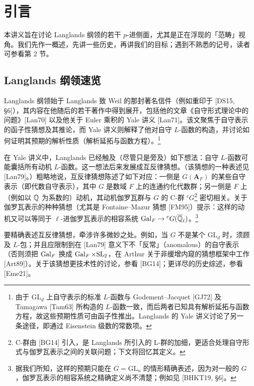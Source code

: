\section{引言}

本讲义旨在讨论 Langlands 纲领的若干 $p$-进侧面，尤其是正在浮现的「范畴」视角。我们先作一概述，先讲一些历史，再讲我们的目标；遇到不熟悉的记号，读者可参看第 2 节。

\subsection{Langlands 纲领速览}

Langlands 纲领始于 Langlands 致 Weil 的那封著名信件（例如重印于 [DS15, §6]），其内容在他随后的若干著作中得到展开，包括他的文章《自守形式理论中的问题》[Lan70] 以及他关于 Euler 乘积的 Yale 讲义 [Lan71]。该文聚焦于自守表示的函子性猜想及其推论，而 Yale 讲义则解释了他对自守 $L$-函数的构造，并讨论如何证明其预期的解析性质（解析延拓与函数方程）。\footnote{由于 $\mathrm{GL}_d$ 上自守表示的标准 $L$-函数与 Godement--Jacquet [GJ72] 及 Tamagawa [Tam63] 所构造的 $L$-函数一致，而后两者已知具有解析延拓与函数方程，故这些预期性质可由函子性推出。Langlands 的 Yale 讲义讨论了另一条途径，即通过 Eisenstein 级数的常数项。}

在 Yale 讲义中，Langlands 已经触及（尽管只是旁及）如下想法：自守 $L$-函数可能囊括所有动机 $L$-函数。这一想法后来发展成互反律猜想。（该猜想的一种表述见 [Lan79]。）粗略地说，互反律猜想陈述了如下对应：一侧是 $G(\mathbf A_F)$ 的某些自守表示（即代数自守表示），其中 $G$ 是数域 $F$ 上的连通约化代数群；另一侧是 $F$ 上（例如以 $\mathbb{Q}$ 为系数的）动机，其动机伽罗瓦群与 $G$ 的 C-群 ${}^cG$\footnote{C-群由 [BG14] 引入，是 Langlands 所引入的 L-群的加细，更适合处理自守形式与伽罗瓦表示之间的关联问题；下文将回忆其定义。} 密切相关。关于伽罗瓦表示的种种猜想（尤其是 Fontaine--Mazur 猜想 [FM95]）提示：这样的动机又可以等同于 $\ell$-进伽罗瓦表示的相容系统 $\operatorname{Gal}_F\to{}^cG(\overline{\mathbb{Q}}_\ell)$。\footnote{据我们所知，这样的预期只能在 $G=\mathrm{GL}_n$ 的情形精确表述，因为对一般的 $G$，伽罗瓦表示的相容系统之精确定义尚不清楚；例如见 [BHKT19, §6]。}

要精确表述互反律猜想，牵涉许多微妙之处。例如，当 $G$ 不是某个 $\mathrm{GL}_d$ 时，须顾及 $L$-包；并且应限制到在 [Lan79] 意义下不「反常」（anomalous）的自守表示（否则须把 $\operatorname{Gal}_F$ 换成 $\operatorname{Gal}_F\times\mathrm{SL}_2$，在 Arthur 关于非缓增内窥的猜想框架中工作 [Art89]）。关于该猜想更技术性的讨论，参看 [BG14]；更详尽的历史综述，参看 [Eme21]。

